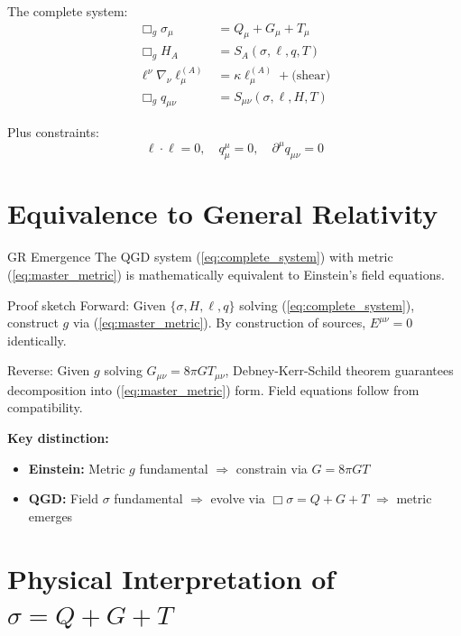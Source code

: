 \documentclass[11pt,a4paper]{article}
\theoremstyle{definition}
\theoremstyle{remark}
\begin{document}
		The complete system:
		\begin{equation}\label{eq:complete_system}
			\boxed{\begin{aligned}
					\Box_g\sigma_\mu &= Q_\mu + G_\mu + T_\mu\\
					\Box_g H_A &= S_A(\sigma, \ell, q, T)\\
					\ell^\nu\nabla_\nu\ell_\mu^{(A)} &= \kappa\ell_\mu^{(A)} + \text{(shear)}\\
					\Box_g q_{\mu\nu} &= S_{\mu\nu}(\sigma, \ell, H, T)
			\end{aligned}}
		\end{equation}
		
		Plus constraints:
		\begin{equation}
			\ell \cdot \ell = 0, \quad q^\mu_\mu = 0, \quad \partial^\mu q_{\mu\nu} = 0
		\end{equation}
		
		\section{Equivalence to General Relativity}
		
		GR Emergence
			The QGD system (\ref{eq:complete_system}) with metric (\ref{eq:master_metric}) is mathematically equivalent to Einstein's field equations.
		
		Proof sketch
			Forward: Given $\{\sigma, H, \ell, q\}$ solving (\ref{eq:complete_system}), construct $g$ via (\ref{eq:master_metric}). By construction of sources, $E^{\mu\nu} = 0$ identically.
			
			Reverse: Given $g$ solving $G_{\mu\nu} = 8\pi GT_{\mu\nu}$, Debney-Kerr-Schild theorem guarantees decomposition into (\ref{eq:master_metric}) form. Field equations follow from compatibility.
		
		\textbf{Key distinction:}
		\begin{itemize}
			\item \textbf{Einstein:} Metric $g$ fundamental $\Rightarrow$ constrain via $G = 8\pi GT$
			\item \textbf{QGD:} Field $\sigma$ fundamental $\Rightarrow$ evolve via $\Box\sigma = Q+G+T$ $\Rightarrow$ metric emerges
		\end{itemize}
		
		\section{Physical Interpretation of $\sigma = Q + G + T$}
		
\end{document}
